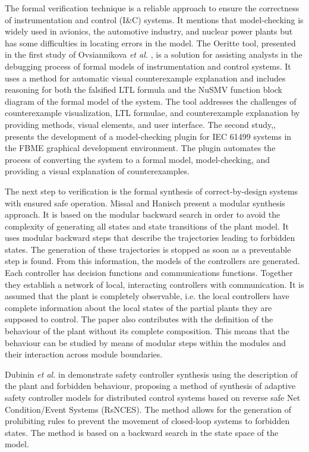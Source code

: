 \begin{bibunit}
 The formal verification technique is a reliable approach to ensure the correctness of instrumentation and control (I\&C) systems. It mentions that model-checking is widely used in avionics, the automotive industry, and nuclear power plants but has some  difficulties in locating errors in the model. The Oeritte tool, presented in the first study of Ovsiannikova \textit{et al.} \cite{ovsiannikova2021oeritte}, is a solution for assisting analysts in the debugging process of formal models of instrumentation and control systems. It uses a method for automatic visual counterexample explanation and includes reasoning for both the falsified LTL formula and the NuSMV function block diagram of the formal model of the system. The tool addresses the challenges of counterexample visualization, LTL formulae, and counterexample explanation by providing methods, visual elements, and user interface. The second study,\cite{ovsiannikova2021towards}, presents the development of a model-checking plugin for IEC 61499 systems in the FBME graphical development environment. The plugin automates the process of converting the system to a formal model, model-checking, and providing a visual explanation of counterexamples.

 The next step to verification is the formal synthesis of correct-by-design systems with ensured safe operation. Missal and Hanisch \cite{missal2008modularA,missal2008modularB} present a modular synthesis approach. It is based on the modular backward search in order to avoid the complexity of generating all states and state transitions of the plant model.
It uses modular backward steps that describe the trajectories leading to forbidden states. The generation of these trajectories is stopped as soon as a preventable step is found. From this information, the models of the controllers are generated. 
Each controller has decision functions and communications functions. Together they establish a network of local, interacting controllers with communication. It is assumed that the plant is completely observable, i.e. the local controllers have complete information about the local states of the partial plants they are supposed to control. 
The paper also contributes with the definition of the behaviour of the plant without its complete composition. This means that the behaviour can be studied by means of modular steps within the modules and their interaction across module boundaries.

Dubinin \textit{et al.} in \cite{dubinin2015synthesis} demonstrate safety controller synthesis  using the description of the plant and forbidden behaviour, proposing a method of synthesis of adaptive safety controller models for distributed control systems based on reverse safe Net Condition/Event Systems (RsNCES). The method allows for the generation of prohibiting rules to prevent the movement of closed-loop systems to forbidden states. The method is based on a backward search in the state space of the model.


\end{bibunit}
